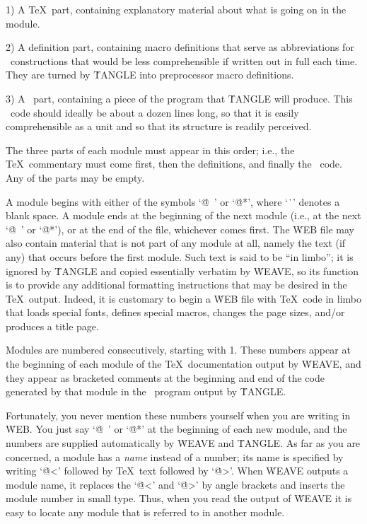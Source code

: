 \yskip\item{1)} A \TeX\ part, containing explanatory material about what
is going on in the module.

\item{2)} A definition part, containing macro definitions that serve as
abbreviations for \Cee\ constructions that would be less comprehensible
if written out in full each time. They are turned by \.{TANGLE} into
preprocessor macro definitions.

\item{3)} A \Cee\ part, containing a piece of the program that
\.{TANGLE} will produce. This \Cee\ code should ideally be about a
dozen lines long, so that it is easily comprehensible as a unit and so
that its structure is readily perceived.

\yskip\noindent The three parts of each module must appear in this order;
i.e., the \TeX\ commentary must come first, then the definitions, and
finally the \Cee\ code. Any of the parts may be empty.

A module begins with either of the symbols `\.{@\ }' or `\.{@*}', where
`\.{\ }' denotes a blank space. A module ends
at the beginning of the next module (i.e., at the next
`\.{@\ }' or `\.{@*}'), or at the end of the file, whichever comes first.
The \.{WEB} file may also contain material that is not part of any module
at all, namely the text (if any) that occurs before the first module.
Such text is said to be ``in limbo''; it is ignored by \.{TANGLE}
and copied essentially verbatim by \.{WEAVE}, so its function is to
provide any additional formatting instructions that may be desired in the
\TeX\ output. Indeed, it is customary to begin a \.{WEB} file with
\TeX\ code in limbo that loads special fonts, defines special macros,
changes the page sizes, and/or produces a title page.

Modules are numbered consecutively, starting with 1. These numbers appear
at the beginning of each module of the \TeX\ documentation output by
\.{WEAVE}, and they appear
as bracketed comments at the beginning and end of the code generated by that
module in the \Cee\ program output by \.{TANGLE}.

Fortunately, you never mention these numbers yourself when you are writing
in \.{WEB}. You just say `\.{@\ }' or `\.{@*}' at the beginning of each
new module, and the numbers are supplied automatically by \.{WEAVE} and
\.{TANGLE}. As far as you are concerned, a module has a
{\sl name\/} instead of a number; its name is specified by writing
`\.{@<}' followed by \TeX\ text followed by `\.{@>}'. When \.{WEAVE}
outputs a module name, it replaces the `\.{@<}' and `\.{@>}' by
angle brackets and inserts the module number in small type. Thus, when you
read the output of \.{WEAVE} it is easy to locate any module that is
referred to in another module.


